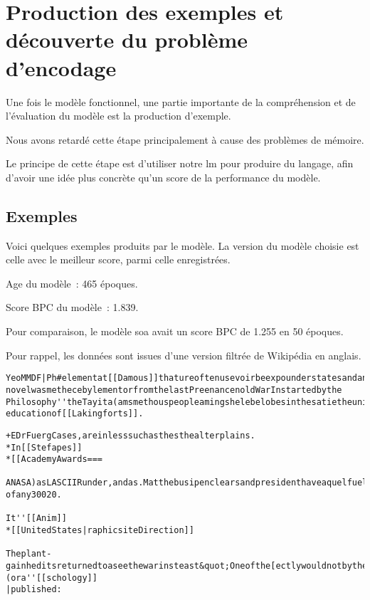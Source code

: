 \section{Production des exemples et découverte du problème d'encodage}
Une fois le modèle fonctionnel, une partie importante de la compréhension et de l'évaluation du modèle est la production d'exemple.

Nous avons retardé cette étape principalement à cause des problèmes de mémoire.

Le principe de cette étape est d'utiliser notre \gls{lm} pour produire du langage, afin d'avoir une idée plus concrète qu'un score de la performance du modèle.

\subsection{Exemples}
Voici quelques exemples produits par le modèle. 
La version du modèle choisie est celle avec le meilleur score, parmi celle enregistrées.

Age du modèle~: 465 époques.

Score BPC du modèle~: 1.839.

Pour comparaison, le modèle \gls{soa} avait un score BPC de 1.255 en 50 époques.

Pour rappel, les données sont issues d'une version filtrée de Wikipédia en anglais.

\begin{lstlisting}[caption={Exemple 1~: une suite de caractères à priori incompréhensibles.},label=gmsnn_ex1]
YeoMMDF|Ph#elementat[[Damous]]thatureoftenusevoirbeexpounderstatesandanumberofhisworkformembersothan novelwasmethecebylementorfromthelastPreenancenoldWarInstartedbythe Philosophy''theTayita(amsmethouspeopleamingshelebelobesinthesatietheuniversalistscientis educationof[[Lakingforts]].
\end{lstlisting}

\begin{lstlisting}[caption={Exemple 2~: des termes balisé comme dans le corpus d'origine, les crochets ouverts sont refermés.},label=gmsnn_ex2]
+EDrFuergCases,areinlesssuchasthesthealterplains.
*In[[Stefapes]]
*[[AcademyAwards===

ANASA)asLASCIIRunder,andas.MatthebusipenclearsandpresidenthaveaquelfuelsifthesearchfromAwarerLievol ofany30020.

It''[[Anim]]
*[[UnitedStates|raphicsiteDirection]]

Theplant-gainheditsreturnedtoaseethewarinsteast&quot;Oneofthe[ectlywouldnotbytheIntegrationscapianland](ora''[[schology]]
|published:
\end{lstlisting}

